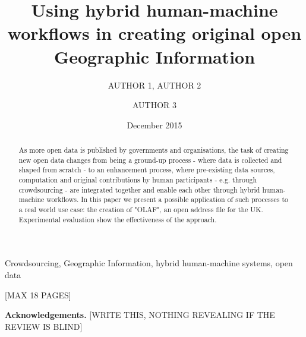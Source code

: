 \documentclass{llncs}
\title{Using hybrid human-machine workflows in creating original open Geographic Information}
\author{AUTHOR 1\inst{1}, AUTHOR 2\inst{1} \and AUTHOR 3\inst{2}}
\institute{INSTITUTE 1 \email{EMAIL FOR AUTHOR 1} \and INSTITUTE 2}
\date{December 2015}
\begin{document}
\maketitle

\begin{abstract}
As more open data is published by governments and organisations, the task of creating new open data changes from being a ground-up process - where data is collected and shaped from scratch - to an enhancement process, where pre-existing data sources, computation and original contributions by human participants - e.g. through crowdsourcing - are integrated together and enable each other through hybrid human-machine workflows. In this paper we present a possible application of such processes to a real world use case: the creation of "OLAF", an open address file for the UK. Experimental evaluation show the effectiveness of the approach.
\end{abstract}

\begin{keywords}
Crowdsourcing, Geographic Information, hybrid human-machine systems, open data 
\end{keywords}

[MAX 18 PAGES]







\textbf{Acknowledgements.} [WRITE THIS, NOTHING REVEALING IF THE REVIEW IS BLIND]


\end{document}
